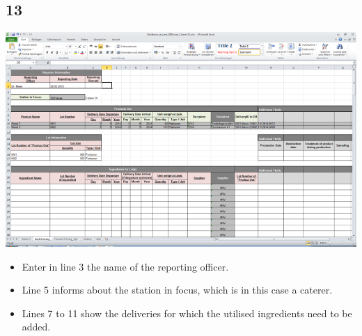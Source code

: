 \documentclass{beamer}
\begin{document}
\subsection{13}
\begin{frame}
	\begin{center}
  		\includegraphics[height=0.65\textheight]{13.png}
	\end{center}
	\begin{itemize}
		\item Enter in line 3 the name of the reporting officer.
		\item Line 5 informs about the station in focus, which is in this case a caterer. 
		\item Lines 7 to 11 show the deliveries for which the utilised ingredients need to be added.
	\end{itemize}
\end{frame}
\end{document}
